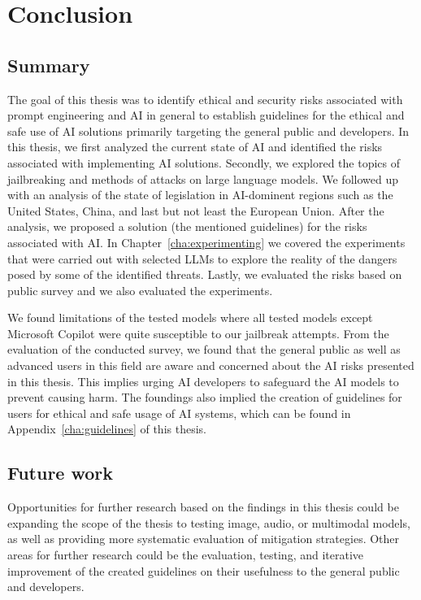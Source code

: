 \chapter{Conclusion}

\section{Summary}

The goal of this thesis was to identify ethical and security risks associated with prompt engineering and AI in general to establish guidelines for the ethical and safe use of AI solutions primarily targeting the general public and developers. In this thesis, we first analyzed the current state of AI and identified the risks associated with implementing AI solutions. Secondly, we explored the topics of jailbreaking and methods of attacks on large language models. We followed up with an analysis of the state of legislation in AI-dominent regions such as the United States, China, and last but not least the European Union. After the analysis, we proposed a solution (the mentioned guidelines) for the risks associated with AI. In Chapter~\ref{cha:experimenting} we covered the experiments that were carried out with selected LLMs to explore the reality of the dangers posed by some of the identified threats. Lastly, we evaluated the risks based on public survey and we also evaluated the experiments. 

We found limitations of the tested models where all tested models except Microsoft Copilot were quite susceptible to our jailbreak attempts. From the evaluation of the conducted survey, we found that the general public as well as advanced users in this field are aware and concerned about the AI risks presented in this thesis. This implies urging AI developers to safeguard the AI models to prevent causing harm. The foundings also implied the creation of guidelines for users for ethical and safe usage of AI systems, which can be found in Appendix~\ref{cha:guidelines} of this thesis.

\section{Future work}

Opportunities for further research based on the findings in this thesis could be expanding the scope of the thesis to testing image, audio, or multimodal models, as well as providing more systematic evaluation of mitigation strategies. Other areas for further research could be the evaluation, testing, and iterative improvement of the created guidelines on their usefulness to the general public and developers.
